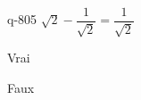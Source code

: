 \begin{truefalse}{q-805}
$\sqrt{2}-\dfrac{1}{\sqrt{2}} = \dfrac{1}{\sqrt{2}}$
\item* Vrai
\item Faux
\end{truefalse}

